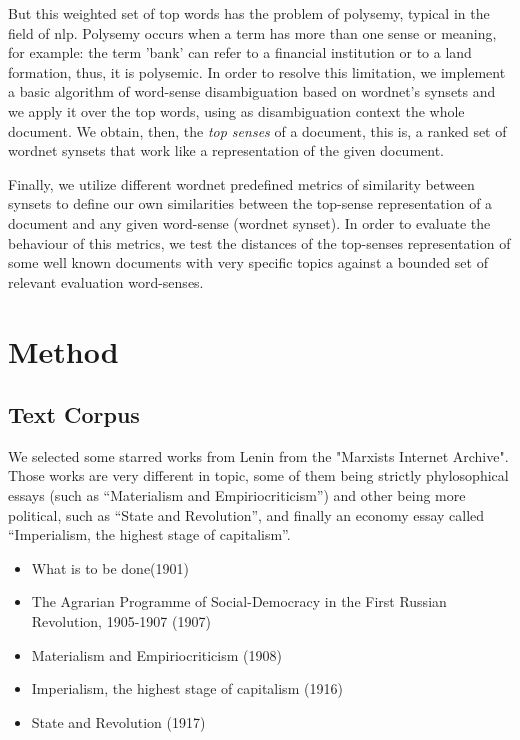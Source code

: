 \documentclass{pnastwo}
\begin{document}
\begin{article}
But this weighted set of top words has the problem of polysemy, typical in the field of nlp. Polysemy occurs when a term has more than one sense or meaning, for example: the term 'bank' can refer to a financial institution or to a land formation, thus, it is polysemic. In order to resolve this limitation, we implement a basic algorithm of word-sense disambiguation based on wordnet's synsets and we apply it over the top words, using as disambiguation context the whole document. We obtain, then, the \textit{top senses} of a document, this is, a ranked set of wordnet synsets that work like a representation of the given document.

Finally, we utilize different wordnet predefined metrics of similarity between synsets to define our own similarities between the top-sense representation of a document and any given word-sense (wordnet synset). In order to evaluate the behaviour of this metrics, we test the distances of the top-senses representation of some well known documents with very specific topics against a bounded set of relevant evaluation word-senses. 


\section{Method}
\subsection{Text Corpus}

We selected some starred works from Lenin from the "Marxists Internet Archive"\cite{LENIN}. Those works are very different in topic, some of them being strictly phylosophical essays (such as ``Materialism and Empiriocriticism'') and other being more political, such as ``State and Revolution'', and finally an economy essay called ``Imperialism, the highest stage of capitalism''. 

\begin{itemize}
  \item What is to be done(1901)
  \item The Agrarian Programme of Social-Democracy in the First Russian Revolution, 1905-1907 (1907)
  \item Materialism and Empiriocriticism (1908)
  \item Imperialism, the highest stage of capitalism (1916)
  \item State and Revolution (1917)
\end{itemize}



\end{article}
\end{document}

